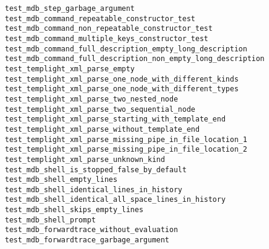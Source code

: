 \begin{description}
    \item[\texttt{test\_mdb\_step\_garbage\_argument}]
    \item[\texttt{test\_mdb\_command\_repeatable\_constructor\_test}]
    \item[\texttt{test\_mdb\_command\_non\_repeatable\_constructor\_test}]
    \item[\texttt{test\_mdb\_command\_multiple\_keys\_constructor\_test}]
    \item[\texttt{test\_mdb\_command\_full\_description\_empty\_long\_description}]
    \item[\texttt{test\_mdb\_command\_full\_description\_non\_empty\_long\_description}]
    \item[\texttt{test\_templight\_xml\_parse\_empty}]
    \item[\texttt{test\_templight\_xml\_parse\_one\_node\_with\_different\_kinds}]
    \item[\texttt{test\_templight\_xml\_parse\_one\_node\_with\_different\_types}]
    \item[\texttt{test\_templight\_xml\_parse\_two\_nested\_node}]
    \item[\texttt{test\_templight\_xml\_parse\_two\_sequential\_node}]
    \item[\texttt{test\_templight\_xml\_parse\_starting\_with\_template\_end}]
    \item[\texttt{test\_templight\_xml\_parse\_without\_template\_end}]
    \item[\texttt{test\_templight\_xml\_parse\_missing\_pipe\_in\_file\_location\_1}]
    \item[\texttt{test\_templight\_xml\_parse\_missing\_pipe\_in\_file\_location\_2}]
    \item[\texttt{test\_templight\_xml\_parse\_unknown\_kind}]
    \item[\texttt{test\_mdb\_shell\_is\_stopped\_false\_by\_default}]
    \item[\texttt{test\_mdb\_shell\_empty\_lines}]
    \item[\texttt{test\_mdb\_shell\_identical\_lines\_in\_history}]
    \item[\texttt{test\_mdb\_shell\_identical\_all\_space\_lines\_in\_history}]
    \item[\texttt{test\_mdb\_shell\_skips\_empty\_lines}]
    \item[\texttt{test\_mdb\_shell\_prompt}]
    \item[\texttt{test\_mdb\_forwardtrace\_without\_evaluation}]
    \item[\texttt{test\_mdb\_forwardtrace\_garbage\_argument}]

\end{description}
